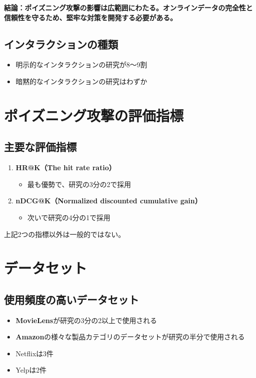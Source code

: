 \documentclass[11pt,a4paper]{article}
\begin{document}
\textbf{結論：ポイズニング攻撃の影響は広範囲にわたる。オンラインデータの完全性と信頼性を守るため、堅牢な対策を開発する必要がある。}

\subsection{インタラクションの種類}
\begin{itemize}
    \item 明示的なインタラクションの研究が8〜9割
    \item 暗黙的なインタラクションの研究はわずか
\end{itemize}

\section{ポイズニング攻撃の評価指標}

\subsection{主要な評価指標}
\begin{enumerate}
    \item \textbf{HR@K（The hit rate ratio）}
    \begin{itemize}
        \item 最も優勢で、研究の3分の2で採用
    \end{itemize}
    
    \item \textbf{nDCG@K（Normalized discounted cumulative gain）}
    \begin{itemize}
        \item 次いで研究の4分の1で採用
    \end{itemize}
\end{enumerate}

上記2つの指標以外は一般的ではない。

\section{データセット}

\subsection{使用頻度の高いデータセット}
\begin{itemize}
    \item \textbf{MovieLens}が研究の3分の2以上で使用される
    \item \textbf{Amazon}の様々な製品カテゴリのデータセットが研究の半分で使用される
    \item Netflixは3件
    \item Yelpは2件
\end{itemize}
\end{document}
